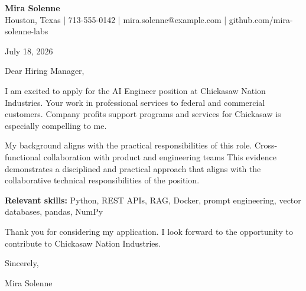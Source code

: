 \documentclass[11pt]{article}
\begin{document}
\begin{center}
{\Large\bfseries Mira Solenne}\\
Houston, Texas | 713-555-0142 | mira.solenne@example.com | github.com/mira-solenne-labs
\end{center}

July 18, 2026

Dear Hiring Manager,

I am excited to apply for the AI Engineer position at Chickasaw Nation Industries. Your work in professional services to federal and commercial customers.
Company profits support programs and services for Chickasaw is especially compelling to me.

My background aligns with the practical responsibilities of this role. Cross-functional collaboration with product and engineering teams This evidence demonstrates a disciplined and practical approach that aligns with the collaborative technical responsibilities of the position.

\textbf{Relevant skills:} Python, REST APIs, RAG, Docker, prompt engineering, vector databases, pandas, NumPy

Thank you for considering my application. I look forward to the opportunity to contribute to Chickasaw Nation Industries.

Sincerely,

Mira Solenne
\end{document}
